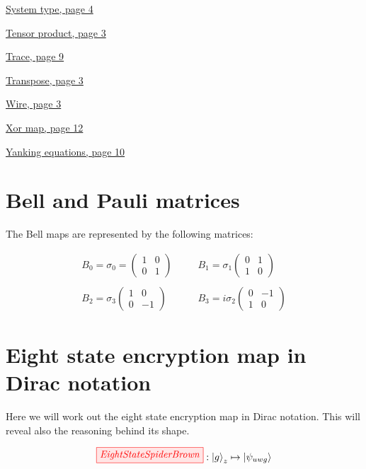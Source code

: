 \documentclass[]{article}
\begin{document}
\hyperref[identity]{System type, page 4}

\hyperref[section:tensorproduct]{Tensor product, page 3}

\hyperref[discarding]{Trace, page 9}

\hyperref[braandket]{Transpose, page 3}

\hyperref[identity]{Wire, page 3}

\hyperref[xorgate]{Xor map, page 12}

\hyperref[section:yankingequations]{Yanking equations, page 10}

\section{Bell and Pauli matrices}
\label{appendix:BellMaps}


The Bell maps are represented by the following matrices:

\begin{equation}
\begin{aligned}
B_0 = \sigma_0 = 
\begin{pmatrix}
1 & 0 \\
0 & 1
\end{pmatrix}  %
~~~~&~~~~ B_1 = \sigma_1
\begin{pmatrix}
0 & 1 \\
1 & 0
\end{pmatrix}%
\\\\
B_2 = \sigma_3
\begin{pmatrix}
1 & 0 \\
0 & -1
\end{pmatrix}  %
~~~~&~~~~  B_3 = i\sigma_2
\begin{pmatrix}
0 & -1 \\
1 & 0
\end{pmatrix}
\end{aligned}
\end{equation}

\section{Eight state encryption map in Dirac notation}
\label{appendix:EightStateEncryptionMapDirac}
Here we will work out the eight state encryption map in Dirac notation. This will reveal also the reasoning behind its shape. 

\begin{equation}
\tikzfig{EightStateSpiderBrown} :
\ket{g}_z \mapsto \ket{\psi_{uwg}}
\end{equation}
\end{document}
